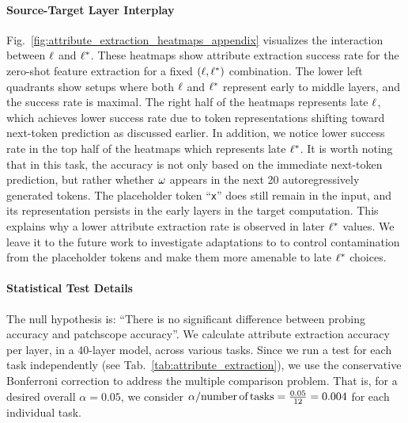 \documentclass{article}
\theoremstyle{plain}
\theoremstyle{definition}
\theoremstyle{remark}
\begin{document}
\paragraph{Source-Target Layer Interplay}
Fig.~\ref{fig:attribute_extraction_heatmaps_appendix} visualizes the interaction between $\ell$ and $\ell^*$. These heatmaps show attribute extraction success rate for the zero-shot feature extraction \methodName{} for a fixed $(\ell, \ell^*)$ combination. The lower left quadrants show setups where both  $\ell$ and $\ell^*$ represent early to middle layers, and the success rate is maximal. The right half of the heatmaps represents late $\ell$, which achieves lower success rate due to token representations shifting toward next-token prediction as discussed earlier. In addition, we notice lower success rate in the top half of the heatmaps which represents late $\ell^*$. 
It is worth noting that in this task, the accuracy is not only based on the immediate next-token prediction, but rather whether $\omega$ appears in the next 20 autoregressively generated tokens. The placeholder token ``\texttt{x}'' does still remain in the input, and its representation persists in the early layers in the target computation. This explains why a lower attribute extraction rate is observed in later $\ell^*$ values. We leave it to the future work to investigate adaptations to \methodFamilyName{} to control contamination from the placeholder tokens and make them more amenable to late $\ell^*$ choices.

\paragraph{Statistical Test Details} The null hypothesis is: ``There is no significant difference between probing accuracy and patchscope accuracy''. We calculate attribute extraction accuracy per layer, in a 40-layer model, across various tasks. Since we run a test for each task independently (see Tab.~\ref{tab:attribute_extraction}), we use the conservative Bonferroni correction to address the multiple comparison problem. That is, for a desired overall $\alpha=0.05$, we consider $\alpha/\text{number\,of\,tasks}=\frac{0.05}{12}=0.004$ for each individual task.
\end{document}
